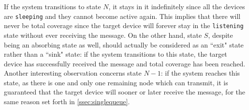 If the system transitions to state $N$, it stays in it indefinitely since all
the devices are \texttt{sleeping} and they cannot become active again. This
implies that there will never be total coverage since the target device will
forever stay in the \texttt{listening} state without ever receiving the message.
On the other hand, state $S$, despite being an absorbing state as well, should
actually be considered as an ``exit" state rather than a ``sink" state: if the
system transitions to this state, the target device has successfully received
the message and total coverage has been reached.\\
Another interesting observation concerns state $N - 1$: if the system reaches
this state, as there is one and only one remaining node which can transmit, it
is guaranteed that the target device will sooner or later receive the message,
for the same reason set forth in \ref{ssec:singlequeue}.

